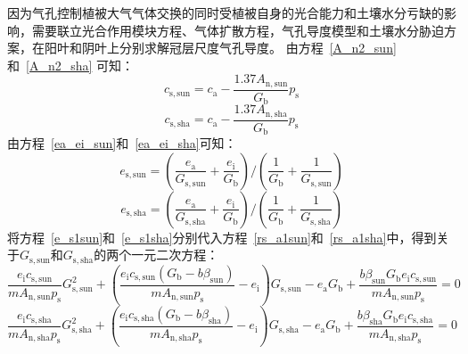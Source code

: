 因为气孔控制植被大气气体交换的同时受植被自身的光合能力和土壤水分亏缺的影响，需要联立光合作用模块方程、气体扩散方程，气孔导度模型和土壤水分胁迫方案，在阳叶和阴叶上分别求解冠层尺度气孔导度。
由方程~\eqref{A_n2_sun}和~\eqref{A_n2_sha} 可知：
\begin{equation}\label{cs_a1sun}
c_{\mathrm{s,sun}}=c_{\mathrm{a}}-\frac{1.37 A_{\mathrm{n,sun}}}{G_{\mathrm{b}}} p_{\mathrm{s}}
\end{equation}
\begin{equation}\label{cs_a1sha}
c_{\mathrm{s,sha}}=c_{\mathrm{a}}-\frac{1.37 A_{\mathrm{n,sha}}}{G_{\mathrm{b}}} p_{\mathrm{s}}
\end{equation}
由方程~\eqref{ea_ei_sun}和~\eqref{ea_ei_sha}可知：
\begin{equation}\label{e_s1sun}
e_{\mathrm{s,sun}}=\left(\frac{e_{\mathrm{a}}}{G_{\mathrm{s,sun}}}+\frac{e_{\mathrm{i}}}{G_{\mathrm{b}}}\right) /\left(\frac{1}{G_{\mathrm{b}}}+\frac{1}{G_{\mathrm{s,sun}}}\right)
\end{equation}
\begin{equation}\label{e_s1sha}
e_{\mathrm{s,sha}}=\left(\frac{e_{\mathrm{a}}}{G_{\mathrm{s,sha}}}+\frac{e_{\mathrm{i}}}{G_{\mathrm{b}}}\right) /\left(\frac{1}{G_{\mathrm{b}}}+\frac{1}{G_{\mathrm{s,sha}}}\right)
\end{equation}
将方程~\eqref{e_s1sun}和~\eqref{e_s1sha}分别代入方程~\eqref{rs_a1sun}和~\eqref{rs_a1sha}中，得到关于$G_{\mathrm{s,sun}}$和$G_{\mathrm{s,sha}}$的两个一元二次方程：
\begin{equation}\label{ei_cssun}
\frac{e_{\mathrm{i}} c_{\mathrm{s,sun}}}{m A_{\mathrm{n,sun}} p_{\mathrm{s}}} G_{\mathrm{s,sun}}^{2}+\left(\frac{e_{\mathrm{i}} c_{\mathrm{s,sun}}\left(G_{\mathrm{b}} -b \beta_{\mathrm{sun}}\right)}{m A_{\mathrm{n,sun}} p_{\mathrm{s}}}-e_{\mathrm{i}}\right) G_{\mathrm{s,sun}}
-e_{\mathrm{a}} G_{\mathrm{b}}+\frac{b \beta_{\mathrm{sun}} G_{\mathrm{b}} e_{\mathrm{i}} c_{\mathrm{s,sun}}}{m A_{\mathrm{n,sun}} p_{\mathrm{s}}}=0
\end{equation}
\begin{equation}\label{ei_cssha}
\frac{e_{\mathrm{i}} c_{\mathrm{s,sha}}}{m A_{\mathrm{n,sha}} p_{\mathrm{s}}} G_{\mathrm{s,sha}}^{2}+\left(\frac{e_{\mathrm{i}} c_{\mathrm{s,sha}}\left(G_{\mathrm{b}} -b \beta_{\mathrm{sha}}\right)}{m A_{\mathrm{n,sha}} p_{\mathrm{s}}}-e_{\mathrm{i}}\right) G_{\mathrm{s,sha}}
-e_{\mathrm{a}} G_{\mathrm{b}}+\frac{b \beta_{\mathrm{sha}} G_{\mathrm{b}} e_{\mathrm{i}} c_{\mathrm{s,sha}}}{m A_{\mathrm{n,sha}} p_{\mathrm{s}}}=0
\end{equation}
